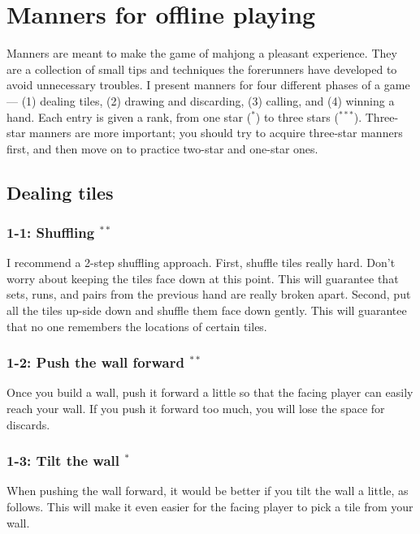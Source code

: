 
\chapter{Manners for offline playing} \label{ch:manners}
\thispagestyle{empty}

Manners are meant to make the game of mahjong a pleasant experience. 
They are a collection of small tips and techniques the forerunners have developed to avoid unnecessary troubles. 
I present manners for four different phases of a game --- (1) dealing tiles, (2) drawing and discarding, (3) calling, and (4) winning a hand. 
Each entry is given a rank, from one star ($^*$) to three stars ($^{***}$). Three-star manners are more important; you should try to acquire three-star manners first, and then move on to practice two-star and one-star ones. 

\section{Dealing tiles}

\subsection*{1-1: Shuffling $^{**}$}
I recommend a 2-step shuffling approach. First, shuffle tiles really hard. Don't worry about keeping the tiles face down at this point. This will guarantee that sets, runs, and pairs from the previous hand are really broken apart. Second, put all the tiles up-side down and shuffle them face down gently. This will guarantee that no one remembers the locations of certain tiles. 

\subsection*{1-2: Push the wall forward $^{**}$}
Once you build a wall, push it forward a little so that the facing player can easily reach your wall. If you push it forward too much, you will lose the space for discards. 


\subsection*{1-3: Tilt the wall $^{*}$}
When pushing the wall forward, it would be better if you tilt the wall a little, as follows. This will make it even easier for the facing player to pick a tile from your wall.
\bp
{}
\ep

